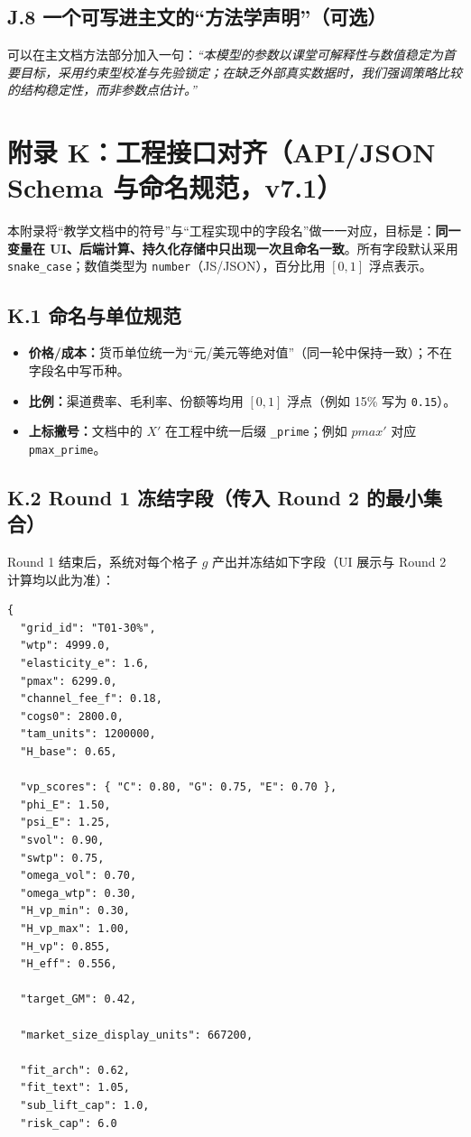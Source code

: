\documentclass[UTF8,12pt]{ctexart}
\begin{document}
\subsection{J.8 一个可写进主文的“方法学声明”（可选）}
可以在主文档方法部分加入一句：\emph{“本模型的参数以课堂可解释性与数值稳定为首要目标，采用约束型校准与先验锁定；在缺乏外部真实数据时，我们强调策略比较的结构稳定性，而非参数点估计。”}


\clearpage
\section{附录 K：工程接口对齐（API/JSON Schema 与命名规范，v7.1）}
本附录将“教学文档中的符号”与“工程实现中的字段名”做一一对应，目标是：\textbf{同一变量在 UI、后端计算、持久化存储中只出现一次且命名一致}。所有字段默认采用 \texttt{snake\_case}；数值类型为 \texttt{number}（JS/JSON），百分比用 $[0,1]$ 浮点表示。

\subsection{K.1 命名与单位规范}
\begin{itemize}
  \item \textbf{价格/成本：}货币单位统一为“元/美元等绝对值”（同一轮中保持一致）；不在字段名中写币种。
  \item \textbf{比例：}渠道费率、毛利率、份额等均用 $[0,1]$ 浮点（例如 15\% 写为 \texttt{0.15}）。
  \item \textbf{上标撇号：}文档中的 $X'$ 在工程中统一后缀 \texttt{\_prime}；例如 $pmax'$ 对应 \texttt{pmax\_prime}。
\end{itemize}

\subsection{K.2 Round 1 冻结字段（传入 Round 2 的最小集合）}
Round 1 结束后，系统对每个格子 $g$ 产出并冻结如下字段（UI 展示与 Round 2 计算均以此为准）：
\begin{verbatim}
{
  "grid_id": "T01-30%",
  "wtp": 4999.0,
  "elasticity_e": 1.6,
  "pmax": 6299.0,
  "channel_fee_f": 0.18,
  "cogs0": 2800.0,
  "tam_units": 1200000,
  "H_base": 0.65,

  "vp_scores": { "C": 0.80, "G": 0.75, "E": 0.70 },
  "phi_E": 1.50,
  "psi_E": 1.25,
  "svol": 0.90,
  "swtp": 0.75,
  "omega_vol": 0.70,
  "omega_wtp": 0.30,
  "H_vp_min": 0.30,
  "H_vp_max": 1.00,
  "H_vp": 0.855,
  "H_eff": 0.556,

  "target_GM": 0.42,

  "market_size_display_units": 667200,

  "fit_arch": 0.62,
  "fit_text": 1.05,
  "sub_lift_cap": 1.0,
  "risk_cap": 6.0
\end{verbatim}
\end{document}
